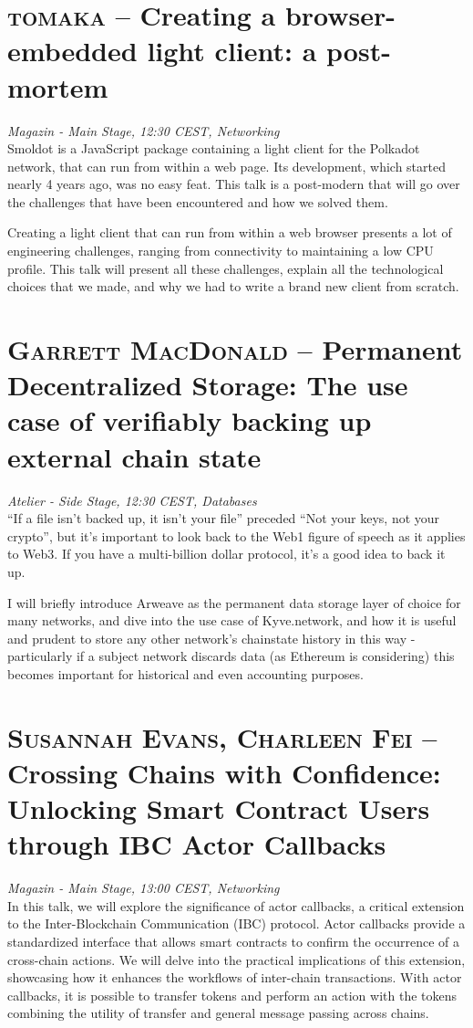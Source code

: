 \section {\textsc{tomaka} -- Creating a browser-embedded light client: a post-mortem
} \noindent \textit {Magazin - Main Stage, 12:30 CEST, Networking
}\\[1em] Smoldot is a JavaScript package containing a light client for the Polkadot network, that can run from within a web page. Its development, which started nearly 4 years ago, was no easy feat. This talk is a post-modern that will go over the challenges that have been encountered and how we solved them.
\par Creating a light client that can run from within a web browser presents a lot of engineering challenges, ranging from connectivity to maintaining a low CPU profile. This talk will present all these challenges, explain all the technological choices that we made, and why we had to write a brand new client from scratch.
\clearpage
\section {\textsc{Garrett MacDonald} -- Permanent Decentralized Storage: The use case of verifiably backing up external chain state
} \noindent \textit {Atelier - Side Stage, 12:30 CEST, Databases
}\\[1em] ``If a file isn't backed up, it isn't your file'' preceded ``Not your keys, not your crypto'', but it's important to look back to the Web1 figure of speech as it applies to Web3. If you have a multi-billion dollar protocol, it's a good idea to back it up.

I will briefly introduce Arweave as the permanent data storage layer of choice for many networks, and dive into the use case of Kyve.network, and how it is useful and prudent to store any other network's chainstate history in this way - particularly if a subject network discards data (as Ethereum is considering) this becomes important for historical and even accounting purposes.
\par \clearpage
\section {\textsc{Susannah Evans, Charleen Fei} -- Crossing Chains with Confidence: Unlocking Smart Contract Users through IBC Actor Callbacks
} \noindent \textit {Magazin - Main Stage, 13:00 CEST, Networking
}\\[1em] In this talk, we will explore the significance of actor callbacks, a critical extension to the Inter-Blockchain Communication (IBC) protocol. Actor callbacks provide a standardized interface that allows smart contracts to confirm the occurrence of a cross-chain actions. We will delve into the practical implications of this extension, showcasing how it enhances the workflows of inter-chain transactions. With actor callbacks, it is possible to transfer tokens and perform an action with the tokens combining the utility of transfer and general message passing across chains.
\par \clearpage
